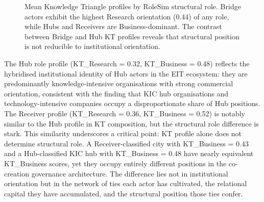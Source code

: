 \documentclass[review,12pt]{elsarticle}
\begin{document}
\begin{figure}[htbp]
\centering
{}
\caption{Mean Knowledge Triangle profiles by RoleSim structural role. Bridge actors exhibit the highest Research orientation (0.44) of any role, while Hubs and Receivers are Business-dominant. The contrast between Bridge and Hub KT profiles reveals that structural position is not reducible to institutional orientation.}
\label{fig:kt-profiles}
\end{figure}

The Hub role profile (KT\_Research = 0.32, KT\_Business = 0.48) reflects the hybridised institutional identity of Hub actors in the EIT ecosystem: they are predominantly knowledge-intensive organisations with strong commercial orientation, consistent with the finding that KIC hub organisations and technology-intensive companies occupy a disproportionate share of Hub positions. The Receiver profile (KT\_Research = 0.36, KT\_Business = 0.52) is notably similar to the Hub profile in KT composition, but the structural role difference is stark. This similarity underscores a critical point: KT profile alone does not determine structural role. A Receiver-classified city with KT\_Business = 0.43 and a Hub-classified KIC hub with KT\_Business = 0.48 have nearly equivalent KT\_Business scores, yet they occupy entirely different positions in the co-creation governance architecture. The difference lies not in institutional orientation but in the network of ties each actor has cultivated, the relational capital they have accumulated, and the structural position those ties confer.
\end{document}
